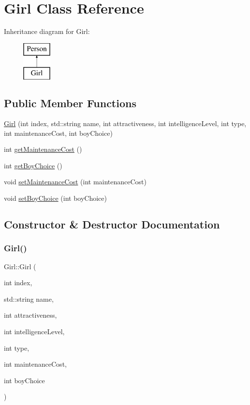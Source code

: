 \hypertarget{class_girl}{}\section{Girl Class Reference}
\label{class_girl}
Inheritance diagram for Girl\+:\begin{figure}[H]
\begin{center}
\leavevmode
\includegraphics[height=2.000000cm]{class_girl}
\end{center}
\end{figure}
\subsection*{Public Member Functions}
\begin{DoxyCompactItemize}
\item 
\hyperlink{class_girl_ac9b2542df0380f51bcd4b3eace7b19f3}{Girl} (int index, std\+::string name, int attractiveness, int intelligence\+Level, int type, int maintenance\+Cost, int boy\+Choice)
\item 
int \hyperlink{class_girl_a8fa9751cb04f9c510a635c9f19a1d4d9}{get\+Maintenance\+Cost} ()
\item 
int \hyperlink{class_girl_a23ed372fae6fc44694d5ffa39fa455cb}{get\+Boy\+Choice} ()
\item 
void \hyperlink{class_girl_a585d7b2bbaec1d608e64fd29138e4632}{set\+Maintenance\+Cost} (int maintenance\+Cost)
\item 
void \hyperlink{class_girl_a48efb2fda11ce41c74511be3bfc2510c}{set\+Boy\+Choice} (int boy\+Choice)
\end{DoxyCompactItemize}


\subsection{Constructor \& Destructor Documentation}
\mbox{\label{class_girl_ac9b2542df0380f51bcd4b3eace7b19f3}} 
\subsubsection{\texorpdfstring{Girl()}{Girl()}}
{\footnotesize\ttfamily Girl\+::\+Girl (\begin{DoxyParamCaption}\item[{int}]{index,  }\item[{std\+::string}]{name,  }\item[{int}]{attractiveness,  }\item[{int}]{intelligence\+Level,  }\item[{int}]{type,  }\item[{int}]{maintenance\+Cost,  }\item[{int}]{boy\+Choice }\end{DoxyParamCaption})}

